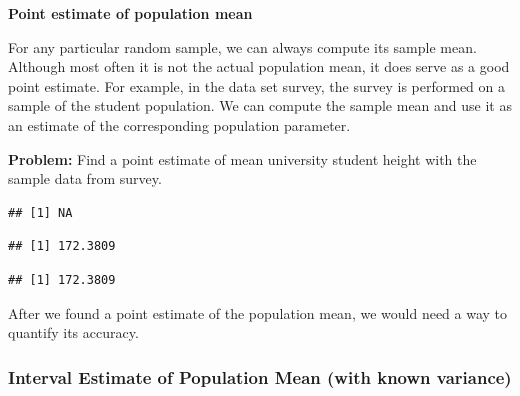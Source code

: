 \documentclass[]{article}
\newenvironment{Shaded}{\begin{snugshade}}{\end{snugshade}}
\newcommand{\KeywordTok}[1]{\textcolor[rgb]{0.13,0.29,0.53}{\textbf{{#1}}}}
\newcommand{\DataTypeTok}[1]{\textcolor[rgb]{0.13,0.29,0.53}{{#1}}}
\newcommand{\CommentTok}[1]{\textcolor[rgb]{0.56,0.35,0.01}{\textit{{#1}}}}
\newcommand{\OtherTok}[1]{\textcolor[rgb]{0.56,0.35,0.01}{{#1}}}
\newcommand{\NormalTok}[1]{{#1}}
\numberwithin{equation}{section}
\begin{document}
\textbf{Point estimate of population mean}

For any particular random sample, we can always compute its sample mean.
Although most often it is not the actual population mean, it does serve
as a good point estimate. For example, in the data set survey, the
survey is performed on a sample of the student population. We can
compute the sample mean and use it as an estimate of the corresponding
population parameter.

\textbf{Problem:} Find a point estimate of mean university student
height with the sample data from survey.

\begin{Shaded}
\end{Shaded}

\begin{verbatim}
## [1] NA
\end{verbatim}

\begin{Shaded}
\end{Shaded}

\begin{verbatim}
## [1] 172.3809
\end{verbatim}

\begin{Shaded}
\end{Shaded}

\begin{verbatim}
## [1] 172.3809
\end{verbatim}

After we found a point estimate of the population mean, we would need a
way to quantify its accuracy.

\subsubsection{Interval Estimate of Population Mean (with known
variance)}\label{interval-estimate-of-population-mean-with-known-variance}
\end{document}
